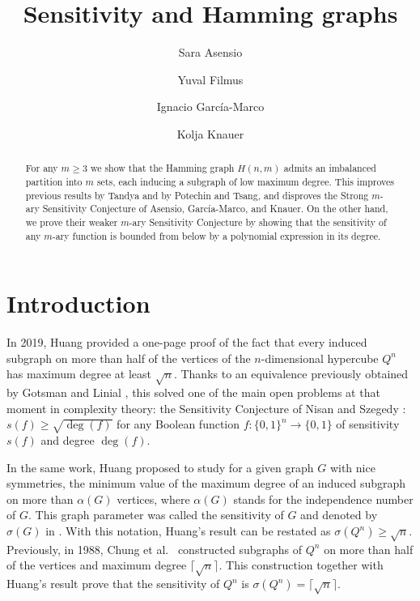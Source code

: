 \documentclass[a4paper,10pt]{amsart}
\title{Sensitivity and Hamming graphs}
\author[S. Asensio]{Sara Asensio}
\author[Y. Filmus]{Yuval Filmus}
\author[I. García-Marco]{Ignacio García-Marco}
\author[K. Knauer]{Kolja Knauer}
\begin{document}
\begin{abstract}
For any $m\geq 3$ we show that the Hamming graph $H(n,m)$ admits an imbalanced partition into $m$ sets, each inducing a subgraph of low maximum degree. This improves previous results by Tandya and by Potechin and Tsang, and disproves the Strong $m$-ary Sensitivity Conjecture of Asensio, García-Marco, and Knauer. On the other hand, we prove their weaker $m$-ary Sensitivity Conjecture by showing that the sensitivity of any $m$-ary function is bounded from below by a polynomial expression in its degree. 
\end{abstract}

\maketitle

\section{Introduction}
In 2019, Huang \cite{H19} provided a one-page proof of the fact that every induced subgraph on more than half of the vertices of the $n$-dimensional hypercube $Q^n$ has maximum degree at least $\sqrt{n}$. Thanks to an equivalence previously obtained by Gotsman and Linial \cite{GL92}, this solved one of the main open problems at that moment in complexity theory: the Sensitivity Conjecture of Nisan and Szegedy \cite{NS94}: $s(f) \geq \sqrt{\deg(f)}$ for any Boolean function $f\colon\{0,1\}^n\to \{0,1\}$ of sensitivity $s(f)$ and degree $\deg(f)$. 

In the same work, Huang proposed to study for a given graph $G$ with nice symmetries, the minimum value of the maximum degree of an induced subgraph on more than $\alpha(G)$ vertices, where $\alpha(G)$ stands for the independence number of $G$. This graph parameter was called the sensitivity of $G$ and denoted by $\sigma(G)$ in \cite{GMK22}. With this notation, Huang's result can be restated as $\sigma(Q^n) \geq \sqrt{n}$. Previously, in 1988, Chung et al.~\cite{CFGS88} constructed subgraphs of $Q^n$ on more than half of the vertices and maximum degree $\lceil \sqrt{n} \rceil$. This construction together with Huang's result prove that the sensitivity of $Q^n$ is $\sigma(Q^n) = \lceil \sqrt{n} \rceil$.
\end{document}

